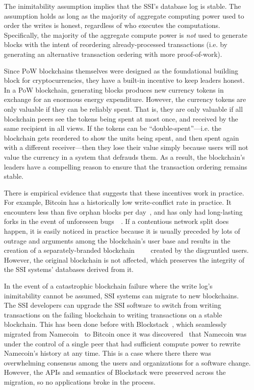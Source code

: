 The inimitability assumption implies that the SSI's database log is stable.
The assumption holds as long as the
majority of aggregate computing power used to order the writes is honest,
regardless of who executes the computations.  Specifically, the majority of the
aggregate compute power is \emph{not} used to generate blocks with the intent of
reordering already-processed transactions (i.e. by generating an alternative
transaction ordering with more proof-of-work).

Since PoW blockchains themselves were designed as the foundational building block for
cryptocurrencies, they have a built-in incentive to keep leaders honest.
In a PoW blockchain, generating blocks produces
new currency tokens in exchange for an enormous energy expenditure.  However, the
currency tokens are only valuable if they can be reliably
spent.  That is, they are only valuable if all blockchain peers see the tokens
being spent at most once, and received by the same recipient in all views.
If the tokens can be ``double-spent''---i.e. the
blockchain gets reordered to show the units being spent, and
then spent again with a different receiver---then they lose their value simply
because users will not value the currency in a system that defrauds them.  As a
result, the blockchain's leaders have a compelling
reason to ensure that the transaction ordering remains stable.

There is empirical evidence that suggests that these incentives work in practice.  For
example, Bitcoin has a historically low write-conflict rate in practice.  It
encounters less than five orphan blocks per
day~\cite{blockchain-info-orphan-rate}, and has only had long-lasting forks in
the event of unforeseen bugs~\cite{bitcoin-deep-fork}~\cite{bitcoin-cve}.  If a contentious network
split does happen, it is easily noticed in practice because it is usually
preceded by lots of outrage and arguments among the blockchain's user
base and results in the creation of a
separately-branded
blockchain~\cite{bcash}~\cite{ethereum-classic}~\cite{zcash-classic}~\cite{expanse}
created by the disgruntled users.  However, the original blockchain is not
affected, which preserves the integrity of the SSI systems' databases derived
from it.

In the event of a catastrophic blockchain failure where the write log's inimitability
cannot be assumed, SSI systems can migrate to new blockchains.  The SSI
developers can upgrade the SSI software to switch from writing transactions on
the failing blockchain to writing transactions on a stable blockchain.  This has
been done before with Blockstack~\cite{blockstack-namecoin-migration}, which
seamlessly migrated from Namecoin~\cite{namecoin} to Bitcoin once it was
discovered~\cite{blockstack} that Namecoin was under the control of a single
peer that had sufficient compute power to rewrite Namecoin's history
at any time.  This is a case where there there was overwhelming consensus among
the users and organizations for a software change.  However, the APIs and
semantics of Blockstack were preserved across the migration, so no applications
broke in the process.

